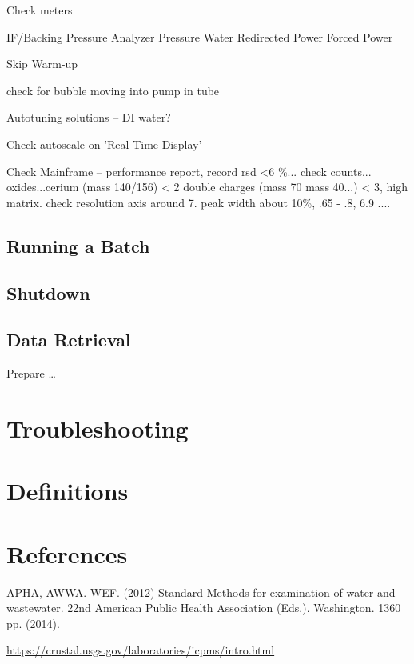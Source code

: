 \documentclass[12pt]{../SOP4_alpha}\usepackage[]{graphicx}\usepackage[]{color}
\begin{document}
\NP Check meters 

IF/Backing Pressure
Analyzer Pressure
Water
Redirected Power
Forced Power


\NP Skip Warm-up

\NP check for bubble moving into pump in tube

\NP Autotuning solutions -- DI water?

\NP Check autoscale on 'Real Time Display'

\NP Check Mainframe -- performance report, record rsd <6 \%... check counts... oxides...cerium (mass 140/156) < 2 double charges (mass 70 mass 40...) < 3, high matrix.  check resolution axis around 7. peak width about 10\%, .65 - .8, 6.9 ....


\subsection{Running a Batch}

\subsection{Shutdown}

\subsection{Data Retrieval}


\NP Prepare \dots

\NP



\section{Troubleshooting}

\section{Definitions} \label{Definitions}

\section{References}

\NP APHA, AWWA. WEF. (2012) Standard Methods for examination of water and wastewater. 22nd American Public Health Association (Eds.). Washington. 1360 pp. (2014).

\url{https://crustal.usgs.gov/laboratories/icpms/intro.html}
\end{document}
